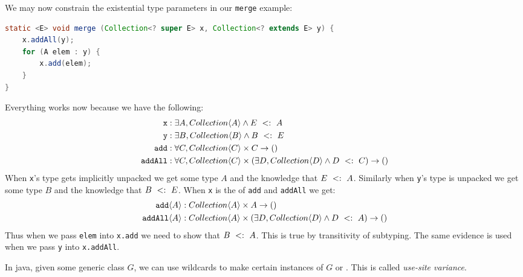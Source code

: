 \documentclass{article}
\begin{document}
\begin{example}
We may now constrain the existential type parameters in our \texttt{merge} example:
\begin{lstlisting}[language=Java]
static <E> void merge (Collection<? super E> x, Collection<? extends E> y) {
    x.addAll(y);
    for (A elem : y) {
        x.add(elem);
    }
}
\end{lstlisting}
Everything works now because we have the following:
\begin{align*}
\texttt{x} &: \exists A, Collection \langle A \rangle \wedge E ~ <: ~ A \\
\texttt{y} &: \exists B, Collection \langle B \rangle \wedge B ~ <: ~ E \\
\texttt{add} &: \forall C, Collection \langle C \rangle \times C \rightarrow () \\
\texttt{addAll} &: \forall C, Collection \langle C \rangle \times (\exists D, Collection \langle D \rangle \wedge D ~ <: ~ C) \rightarrow () \\
\end{align*}
When \texttt{x}'s type gets implicitly unpacked we get some type $A$ and the knowledge that $E ~ <: ~ A$.
Similarly when \texttt{y}'s type is unpacked we get some type $B$ and the knowledge that $B ~ <: ~ E$.
When \texttt{x} is the \receiver{} of \texttt{add} and \texttt{addAll} we get:
\begin{align*}
\texttt{add} \langle A \rangle &: Collection \langle A \rangle \times A \rightarrow () \\
\texttt{addAll} \langle A \rangle &: Collection \langle A \rangle \times (\exists D, Collection \langle D \rangle \wedge D ~ <: ~ A) \rightarrow () \\
\end{align*}
Thus when we pass \texttt{elem} into \texttt{x.add} we need to show that $B ~ <: ~ A$.
This is true by transitivity of subtyping.
The same evidence is used when we pass \texttt{y} into \texttt{x.addAll}.
\end{example}

In java, given some generic class $G$, we can use wildcards to make certain instances of $G$ \covar{} or \contra{}.
This is called \textit{use-site variance}.
\end{document}
